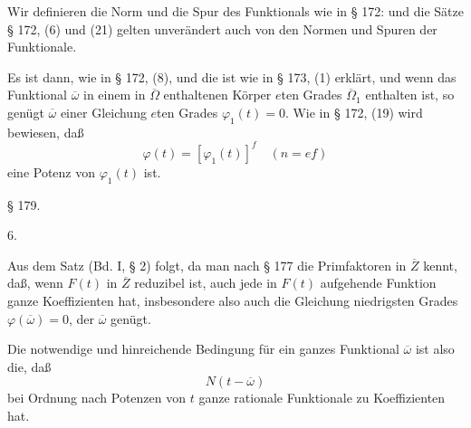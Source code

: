 

Wir definieren die Norm und die Spur des Funktionals wie in § 172:
und die Sätze § 172, (6) und (21) gelten unverändert auch von den Normen und Spuren der Funktionale.

Es ist dann, wie in § 172, (8),
und die  ist wie in § 173, (1) erklärt, und wenn das Funktional $\overline{\omega}$ in einem in $\overline{\Omega}$ enthaltenen Körper $e$ten Grades $\overline{\Omega}_1$ enthalten ist, so genügt $\overline{\omega}$ einer Gleichung $e$ten Grades $\varphi_1(t) = 0$. Wie in § 172, (19) wird bewiesen, daß
\[
\varphi(t) = [\varphi_1(t)]^f \quad (n = ef)
\]
eine Potenz von $\varphi_1(t)$ ist.

\begin{center}
§ 179.\\
\end{center}

6. 

Aus dem  Satz (Bd. I, § 2) folgt, da man nach § 177 die Primfaktoren in $\overline{Z}$ kennt, daß, wenn $F(t)$ in $\overline{Z}$ reduzibel ist, auch jede in $F(t)$ aufgehende Funktion ganze Koeffizienten hat, insbesondere also auch die Gleichung niedrigsten Grades $\varphi(\overline{\omega}) = 0$, der $\overline{\omega}$ genügt.

Die notwendige und hinreichende Bedingung für ein ganzes Funktional $\overline{\omega}$ ist also die, daß
\[
N(t - \overline{\omega})
\]
bei Ordnung nach Potenzen von $t$ ganze rationale Funktionale zu Koeffizienten hat.
